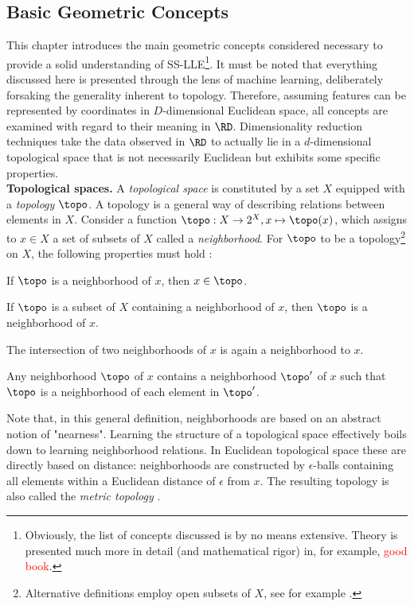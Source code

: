 \subsection{Basic Geometric Concepts}
\label{math-obj}

This chapter introduces the main geometric concepts considered necessary to
provide a solid understanding of SS-LLE\footnote{
Obviously, the list of concepts discussed is by no means extensive. Theory is
presented much more in detail (and mathematical rigor) in, for example, 
\textcolor{red}{good book}.
}.
It must be noted that everything discussed here is presented through the lens of
machine learning, deliberately forsaking the generality inherent to topology.
Therefore, assuming features can be represented by coordinates in 
$D$-dimensional Euclidean space, all concepts are examined with regard to their
meaning in $\RD$.
Dimensionality reduction techniques take the data observed in $\RD$ to actually
lie in a $d$-dimensional topological space that is not necessarily Euclidean but
exhibits some specific properties.
\\


\textbf{Topological spaces.} A \textit{topological space} is constituted by a 
set $X$ equipped with a \textit{topology} $\topo$. 
A topology is a general way of describing relations between elements in $X$.
Consider a function $\topo: X \rightarrow 2^X, x \mapsto \topo(x)$, which 
assigns to $x \in X$ a set of subsets of $X$ called a \textit{neighborhood}.
For $\topo$ to be a topology\footnote{
Alternative definitions employ open subsets of $X$, see for example 
\citet{waldmann2014}.
}
on $X$, the following properties must hold \citep{brown2006}:
\begin{tight_enumerate}
  \item If $\topo$ is a neighborhood of $x$, then $x \in \topo$.
  \item If $\topo$ is a subset of $X$ containing a neighborhood of $x$, then 
  $\topo$ is a neighborhood of $x$.
  \item The intersection of two neighborhoods of $x$ is again a neighborhood to
  $x$.
  \item Any neighborhood $\topo$ of $x$ contains a neighborhood $\topo^{\prime}$ 
  of $x$ such that $\topo$ is a neighborhood of each element in 
  $\topo^{\prime}$.
\end{tight_enumerate}

Note that, in this general definition, neighborhoods are based on an abstract
notion of "nearness". 
Learning the structure of a topological space effectively boils down to learning 
neighborhood relations.
In Euclidean topological space these are directly based on distance: 
neighborhoods are constructed by $\epsilon$-balls containing all elements within 
a Euclidean distance of $\epsilon$ from $x$. 
The resulting topology is also called the \textit{metric topology} 
\citep{mccleary2006}.

